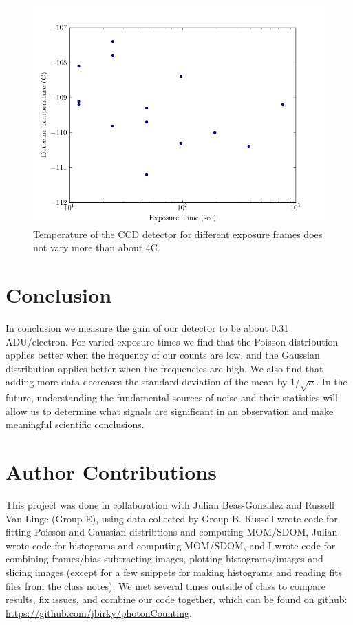\documentclass[preprint]{aastex62}
\begin{document}
\begin{figure}[H]
\begin{center}
\includegraphics[width=.48\linewidth]{plots/exposure_temp.png}
\caption{Temperature of the CCD detector for different exposure frames does not vary more than about 4C.} \label{fig:temp}
\end{center}
\end{figure}

\section{Conclusion}
In conclusion we measure the gain of our detector to be about 0.31 ADU/electron. For varied exposure times we find that the Poisson distribution applies better when the frequency of our counts are low, and the Gaussian distribution applies better when the frequencies are high. We also find that adding more data decreases the standard deviation of the mean by 1/$\sqrt{n}$. In the future, understanding the fundamental sources of noise and their statistics will allow us to determine what signals are significant in an observation and make meaningful scientific conclusions.

\section{Author Contributions}

This project was done in collaboration with Julian Beas-Gonzalez and Russell Van-Linge (Group E), using data collected by Group B. Russell wrote code for fitting Poisson and Gaussian distribtions and computing MOM/SDOM, Julian wrote code for histograms and computing MOM/SDOM, and I wrote code for combining frames/bias subtracting images, plotting histograms/images and slicing images (except for a few snippets for making histograms and reading fits files from the class notes). We met several times outside of class to compare results, fix issues, and combine our code together, which can be found on github: \href{https://github.com/jbirky/photonCounting}{https://github.com/jbirky/photonCounting}.
\end{document}
